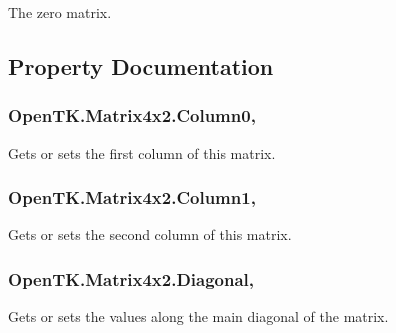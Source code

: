 The zero matrix. 



\subsection{Property Documentation}
\hypertarget{struct_open_t_k_1_1_matrix4x2_aa4e6a7dccd9d6808982bbe89e11226c3}{
\subsubsection[{Column0}]{ Open\-T\-K.\-Matrix4x2.\-Column0\hspace{0.3cm}{\ttfamily [get]}, {\ttfamily [set]}}}\label{struct_open_t_k_1_1_matrix4x2_aa4e6a7dccd9d6808982bbe89e11226c3}


Gets or sets the first column of this matrix. 

\hypertarget{struct_open_t_k_1_1_matrix4x2_a2dbdba90c96b8491972241c6799f6ec9}{
\subsubsection[{Column1}]{ Open\-T\-K.\-Matrix4x2.\-Column1\hspace{0.3cm}{\ttfamily [get]}, {\ttfamily [set]}}}\label{struct_open_t_k_1_1_matrix4x2_a2dbdba90c96b8491972241c6799f6ec9}


Gets or sets the second column of this matrix. 

\hypertarget{struct_open_t_k_1_1_matrix4x2_ab824516b82bcee1c62a714db6d0378a4}{
\subsubsection[{Diagonal}]{ Open\-T\-K.\-Matrix4x2.\-Diagonal\hspace{0.3cm}{\ttfamily [get]}, {\ttfamily [set]}}}\label{struct_open_t_k_1_1_matrix4x2_ab824516b82bcee1c62a714db6d0378a4}


Gets or sets the values along the main diagonal of the matrix. 

